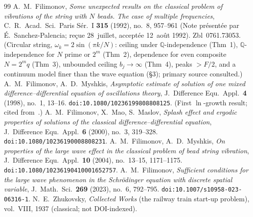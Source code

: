 \documentclass[11pt,reqno]{amsart}
\theoremstyle{plain}
\theoremstyle{definition}
\newcommand{\Q}{\mathbb{Q}}
\begin{document}
\begin{thebibliography}{99}
 A.~M.~Filimonov, \emph{Some unexpected results on the classical problem of vibrations of the string with $N$ beads. The case of multiple frequencies}, C.~R.~Acad.\ Sci.\ Paris S\'er.~I \textbf{315} (1992), no.~8, 957--961 (Note pr\'esent\'ee par \'E.~Sanchez-Palencia; re\c{c}ue 28~juillet, accept\'ee 12~ao\^ut 1992). Zbl~0761.73053. (Circular string, $\omega_k=2\sin(\pi k/N)$: ceiling under $\Q$-independence (Thm~1), $\Q$-independence for $N$ prime or $2^m$ (Thm~2), dependence for even composite $N=2^m q$ (Thm~3), unbounded ceiling $b_j\to\infty$ (Thm~4), peaks $>F/2$, and a continuum model finer than the wave equation (\S3); primary source consulted.)
 A.~M.~Filimonov, A.~D.~Myshkis, \emph{Asymptotic estimate of solution of one mixed difference--differential equation of oscillations theory}, J.~Difference Equ.\ Appl.\ \textbf{4} (1998), no.~1, 13--16. \texttt{doi:10.1080/10236199808808125}. (First $\ln$-growth result; cited from~\cite{MF03}.)
 A.~M.~Filimonov, X.~Mao, S.~Maslov, \emph{Splash effect and ergodic properties of solutions of the classical difference--differential equation}, J.~Difference Equ.\ Appl.\ \textbf{6} (2000), no.~3, 319--328. \texttt{doi:10.1080/10236190008808231}.
 A.~M.~Filimonov, A.~D.~Myshkis, \emph{On properties of the large wave effect in the classical problem of bead string vibration}, J.~Difference Equ.\ Appl.\ \textbf{10} (2004), no.~13--15, 1171--1175. \texttt{doi:10.1080/10236190410001652757}.
 A.~M.~Filimonov, \emph{Sufficient conditions for the large wave phenomenon in the Schr\"odinger equation with discrete spatial variable}, J.~Math.\ Sci.\ \textbf{269} (2023), no.~6, 792--795. \texttt{doi:10.1007/s10958-023-06316-1}.
 N.~E.~Zhukovsky, \emph{Collected Works} (the railway train start-up problem), vol.~VIII, 1937 (classical; not DOI-indexed).


\end{thebibliography}
\end{document}
